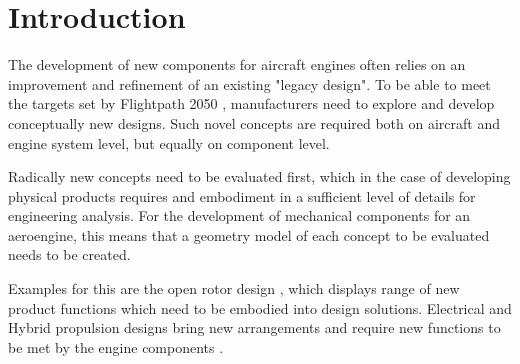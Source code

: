 \documentclass[aerospace,article,submit,moreauthors,pdftex]{Definitions/mdpi}
\begin{document}


\section{Introduction}
The development of new components for aircraft engines often relies on an improvement and refinement of an existing "legacy design".
To be able to meet the targets set by Flightpath 2050 \cite{ACARE2017StrategicAgenda}, manufacturers need to explore and develop conceptually new designs.
Such novel concepts are required both on aircraft and engine system level, but equally on component level.

Radically new concepts need to be evaluated first, which in the case of developing physical products requires and embodiment in a sufficient level of details for engineering analysis.
For the development of mechanical components for an aeroengine, this means that a geometry model of each concept to be evaluated needs to be created. 

Examples for this are the open rotor design \cite{Larsson2006ComponentInnovation}, which displays range of new product functions which need to be embodied into design solutions.
 Electrical and Hybrid propulsion designs bring new arrangements and require new functions to be met by the engine components
 \cite{Filipenko2020ComparativeSystems, Parker2010GreenEnvironment}. 
\end{document}
